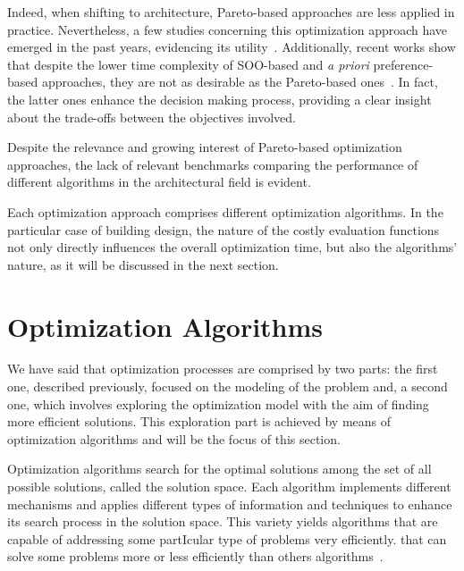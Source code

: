 	Indeed, when shifting to architecture, Pareto-based approaches are less applied in practice. Nevertheless, a few studies concerning this optimization approach have emerged in the past years, evidencing its utility~\cite{Evins2013,Hamdy2016}. Additionally, recent works show that despite the lower time complexity of \ac{SOO}-based and \textit{a priori} preference-based approaches, they are not as desirable as the Pareto-based ones~\cite{Attia2013,Cichocka2017SURVEY}. In fact, the latter ones enhance the decision making process, providing a clear insight about the trade-offs between the objectives involved. %

	Despite the relevance and growing interest of Pareto-based optimization approaches, the lack of relevant benchmarks comparing the performance of different algorithms in the architectural field is evident. 


	Each optimization approach comprises different optimization algorithms. In the particular case of building design, the nature of the costly evaluation functions not only directly influences the overall optimization time, but also the algorithms' nature, as it will be discussed in the next section. 
	

\section{Optimization Algorithms}
\label{sec:optimizationalgorithms}
	
	We have said that optimization processes are comprised by two parts: the first one, described previously, focused on the modeling of the problem and, a second one, which involves exploring the optimization model with the aim of finding more efficient solutions. This exploration part is achieved by means of optimization algorithms and will be the focus of this section. 
	
	Optimization algorithms search for the optimal solutions among the set of all possible solutions, called the solution space. Each algorithm implements different mechanisms and applies different types of information and techniques to enhance its search process in the solution space. This variety yields algorithms that are capable of addressing some partIcular type of problems very efficiently. that can solve some problems more or less efficiently than others algorithms~\cite{Wolpert1997NFLT}.
	
